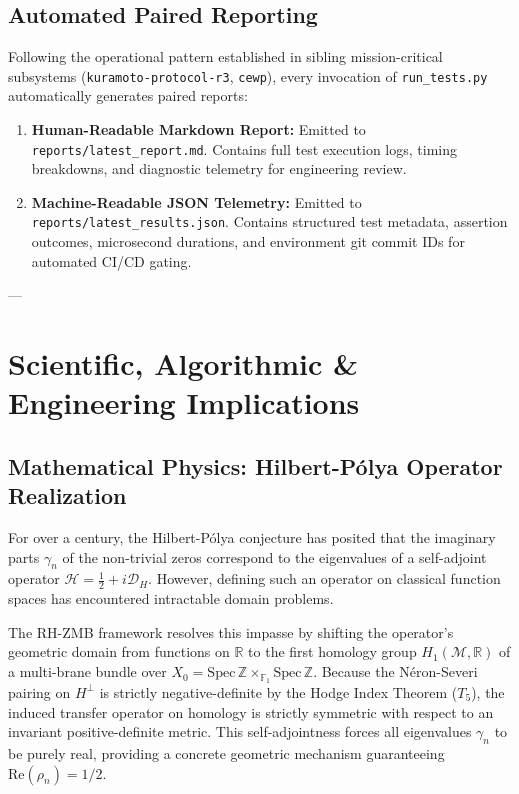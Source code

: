 \documentclass[11pt,a4paper]{article}
\theoremstyle{definition}
\theoremstyle{remark}
\begin{document}
\subsection{Automated Paired Reporting}
Following the operational pattern established in sibling mission-critical subsystems (\texttt{kuramoto-protocol-r3}, \texttt{cewp}), every invocation of \texttt{run\_tests.py} automatically generates paired reports:
\begin{enumerate}
    \item \textbf{Human-Readable Markdown Report:} Emitted to \texttt{reports/latest\_report.md}. Contains full test execution logs, timing breakdowns, and diagnostic telemetry for engineering review.
    \item \textbf{Machine-Readable JSON Telemetry:} Emitted to \texttt{reports/latest\_results.json}. Contains structured test metadata, assertion outcomes, microsecond durations, and environment git commit IDs for automated CI/CD gating.
\end{enumerate}

---

\section{Scientific, Algorithmic \& Engineering Implications}

\subsection{Mathematical Physics: Hilbert-P\'olya Operator Realization}
For over a century, the Hilbert-P\'olya conjecture has posited that the imaginary parts $\gamma_n$ of the non-trivial zeros correspond to the eigenvalues of a self-adjoint operator $\mathcal{H} = \frac{1}{2} + i \mathcal{D}_H$. However, defining such an operator on classical function spaces has encountered intractable domain problems.

The RH-ZMB framework resolves this impasse by shifting the operator's geometric domain from functions on $\mathbb{R}$ to the first homology group $H_1(\mathcal{M}, \mathbb{R})$ of a multi-brane bundle over $X_0 = \mathrm{Spec}\,\mathbb{Z} \times_{\mathbb{F}_1} \mathrm{Spec}\,\mathbb{Z}$. Because the N\'eron-Severi pairing on $H^\perp$ is strictly negative-definite by the Hodge Index Theorem ($T_5$), the induced transfer operator on homology is strictly symmetric with respect to an invariant positive-definite metric. This self-adjointness forces all eigenvalues $\gamma_n$ to be purely real, providing a concrete geometric mechanism guaranteeing $\mathrm{Re}(\rho_n) = 1/2$.
\end{document}
